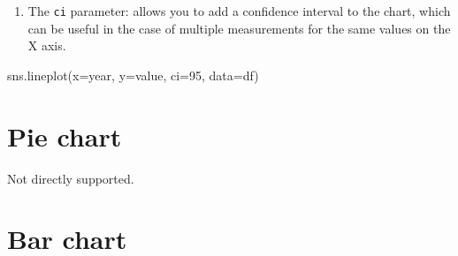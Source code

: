 \documentclass[
  english,
  letterpaper,
  DIV=11,
  numbers=noendperiod]{scrreprt}
\newenvironment{Shaded}{\begin{snugshade}}{\end{snugshade}}
\newcommand{\DecValTok}[1]{\textcolor[rgb]{0.68,0.00,0.00}{#1}}
\newcommand{\NormalTok}[1]{\textcolor[rgb]{0.00,0.23,0.31}{#1}}
\newcommand{\OperatorTok}[1]{\textcolor[rgb]{0.37,0.37,0.37}{#1}}
\newcommand{\StringTok}[1]{\textcolor[rgb]{0.13,0.47,0.30}{#1}}
\providecommand{\tightlist}{%
  \setlength{\itemsep}{0pt}\setlength{\parskip}{0pt}}
\begin{document}
\begin{enumerate}
\def\labelenumi{\arabic{enumi}.}
\setcounter{enumi}{3}
\tightlist
\item
  The \texttt{ci} parameter: allows you to add a confidence interval to
  the chart, which can be useful in the case of multiple measurements
  for the same values on the X axis.
\end{enumerate}

\begin{Shaded}
\begin{Highlighting}[]
\NormalTok{sns.lineplot(x}\OperatorTok{=}\StringTok{\textquotesingle{}year\textquotesingle{}}\NormalTok{, y}\OperatorTok{=}\StringTok{\textquotesingle{}value\textquotesingle{}}\NormalTok{, ci}\OperatorTok{=}\DecValTok{95}\NormalTok{, data}\OperatorTok{=}\NormalTok{df)}
\end{Highlighting}
\end{Shaded}

\section{Pie chart}\label{pie-chart}

Not directly supported.

\section{Bar chart}\label{bar-chart}
\end{document}
